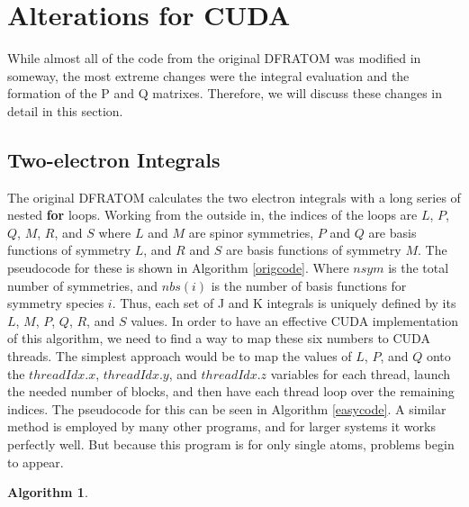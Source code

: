 \documentclass[12pt]{report}
\newtheorem{algorithm}[theorem]{Algorithm}
\begin{document}
\section{Alterations for CUDA}
While almost all of the code from the original DFRATOM\cite{MATSUOKA2001218} was modified in someway, the most extreme changes were the integral evaluation and the formation of the P and Q matrixes. Therefore, we will discuss these changes in detail in this section.

\subsection{Two-electron Integrals}
The original DFRATOM calculates the two electron integrals with a long series of nested \textbf{for} loops. Working from the outside in, the indices of the loops are $L$, $P$, $Q$, $M$, $R$, and $S$ where $L$ and $M$ are spinor symmetries, $P$ and $Q$ are basis functions of symmetry $L$, and $R$ and $S$ are basis functions of symmetry $M$. The pseudocode for these is shown in Algorithm \ref{origcode}. Where $nsym$ is the total number of symmetries, and $nbs(i)$ is the number of basis functions for symmetry species $i$. Thus, each set of J and K integrals is uniquely defined by its $L$, $M$, $P$, $Q$, $R$, and $S$ values. In order to have an effective CUDA implementation of this algorithm, we need to find a way to map these six numbers to CUDA threads. The simplest approach would be to map the values of $L$, $P$, and $Q$ onto the $threadIdx.x$, $threadIdx.y$, and $threadIdx.z$ variables for each thread, launch the needed number of blocks, and then have each thread loop over the remaining indices. The pseudocode for this can be seen in Algorithm \ref{easycode}. A similar method is employed by many other programs, and for larger systems it works perfectly well. But because this program is for only single atoms, problems begin to appear.

\begin{algorithm}
\caption{The original }
\label{origcode}
\begin{algorithmic}
				\ELSE
				\ENDIF
					\ELSE
					\ENDIF
					\ENDFOR
				\ENDFOR
			\ENDFOR
		\ENDFOR
	\ENDFOR
\ENDFOR
\end{algorithmic}
\end{algorithm}
\end{document}

